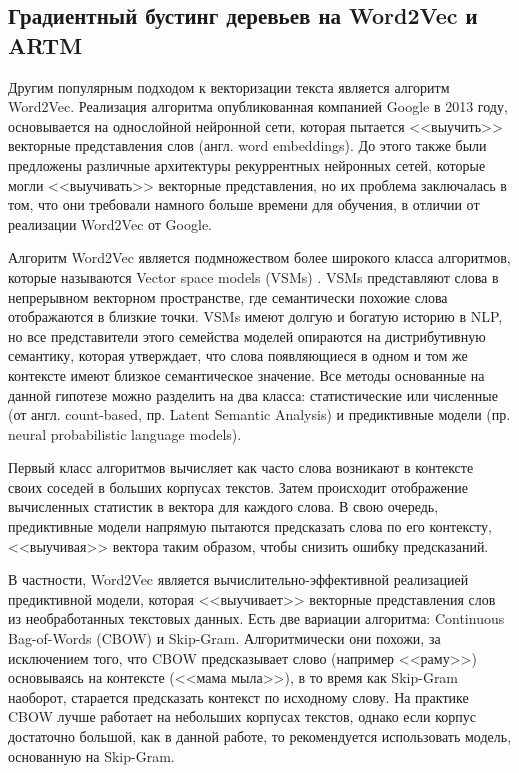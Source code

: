 \documentclass[a4paper, 14pt]{extarticle}
\begin{document}
\subsection{Градиентный бустинг деревьев на Word2Vec и ARTM}
Другим популярным подходом к векторизации текста является алгоритм Word2Vec.
Реализация алгоритма опубликованная компанией Google \cite{DBLP:journals/corr/abs-1301-3781} в 2013 году,
основывается на однослойной нейронной сети, которая пытается <<выучить>> векторные представления слов (англ. word embeddings).
До этого также были предложены различные архитектуры рекуррентных нейронных сетей, которые могли <<выучивать>> векторные представления,
но их проблема заключалась в том, что они требовали намного больше времени для обучения, в отличии от реализации Word2Vec от Google.

Алгоритм Word2Vec является подмножеством более широкого класса алгоритмов, которые называются Vector space models (VSMs) 
\cite{Salton:1975:VSM:361219.361220}. VSMs представляют слова в непрерывном векторном пространстве, где семантически похожие
слова отображаются в близкие точки. VSMs имеют долгую и богатую историю в NLP, но все представители этого семейства моделей опираются
на дистрибутивную семантику, которая утверждает, что слова появляющиеся в одном и том же контексте имеют близкое семантическое значение.
Все методы основанные на данной гипотезе можно разделить на два класса: статистические или численные (от англ. count-based, пр. Latent Semantic 
Analysis) и предиктивные модели (пр. neural probabilistic language models).

Первый класс алгоритмов вычисляет как часто слова возникают в контексте своих соседей в больших корпусах текстов. Затем происходит отображение
вычисленных статистик в вектора для каждого слова. В свою очередь, предиктивные модели напрямую пытаются предсказать слова по его контексту,
<<выучивая>> вектора таким образом, чтобы снизить ошибку предсказаний.

В частности, Word2Vec является вычислительно-эффективной реализацией предиктивной модели, которая <<выучивает>> векторные представления слов
из необработанных текстовых данных. Есть две вариации алгоритма: Continuous Bag-of-Words (CBOW) и Skip-Gram. Алгоритмически они похожи, за 
исключением того, что CBOW предсказывает слово (например <<раму>>) основываясь на контексте (<<мама мыла>>), в то время как Skip-Gram наоборот,
старается предсказать контекст по исходному слову. На практике CBOW лучше работает на небольших корпусах текстов, однако если корпус достаточно
большой, как в данной работе, то рекомендуется использовать модель, основанную на Skip-Gram.
\end{document}
